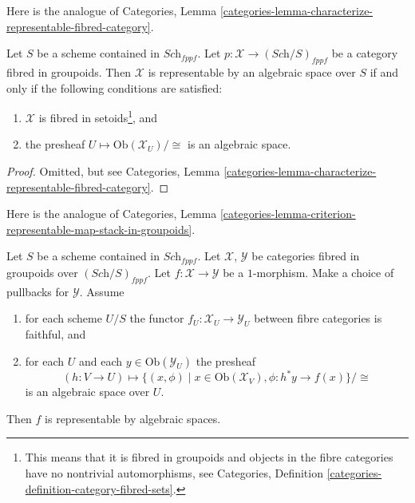 \medskip\noindent
Here is the analogue of Categories,
Lemma \ref{categories-lemma-characterize-representable-fibred-category}.

\begin{lemma}
\label{lemma-characterize-representable-by-space}
Let $S$ be a scheme contained in $\textit{Sch}_{fppf}$.
Let $p : \mathcal{X} \to (\textit{Sch}/S)_{fppf}$
be a category fibred in groupoids.
Then $\mathcal{X}$ is representable by an algebraic space over $S$
if and only if the following conditions are satisfied:
\begin{enumerate}
\item $\mathcal{X}$ is fibred in setoids\footnote{This means that
it is fibred in groupoids and objects in the fibre categories
have no nontrivial automorphisms, see Categories,
Definition \ref{categories-definition-category-fibred-sets}.}, and
\item the presheaf $U \mapsto \text{Ob}(\mathcal{X}_U)/\cong$ is
an algebraic space.
\end{enumerate}
\end{lemma}

\begin{proof}
Omitted, but see Categories,
Lemma \ref{categories-lemma-characterize-representable-fibred-category}.
\end{proof}

\noindent
Here is the analogue of Categories,
Lemma \ref{categories-lemma-criterion-representable-map-stack-in-groupoids}.

\begin{lemma}
\label{lemma-criterion-map-representable-spaces-fibred-in-groupoids}
Let $S$ be a scheme contained in $\textit{Sch}_{fppf}$.
Let $\mathcal{X}$, $\mathcal{Y}$ be categories fibred in groupoids
over $(\textit{Sch}/S)_{fppf}$.
Let $f : \mathcal{X} \to \mathcal{Y}$ be a $1$-morphism.
Make a choice of pullbacks for $\mathcal{Y}$.
Assume
\begin{enumerate}
\item for each scheme $U/S$ the
functor $f_U : \mathcal{X}_U \longrightarrow \mathcal{Y}_U$
between fibre categories is faithful, and
\item for each $U$ and each $y \in \text{Ob}(\mathcal{Y}_U)$ the presheaf
$$
(h : V \to U)
\longmapsto
\{(x, \phi) \mid x \in \text{Ob}(\mathcal{X}_V), \phi : h^*y \to f(x)\}/\cong
$$
is an algebraic space over $U$.
\end{enumerate}
Then $f$ is representable by algebraic spaces.
\end{lemma}

